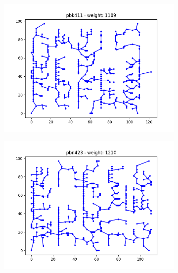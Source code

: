 \documentclass{article}
\def\v{0.4}
\begin{document}
\begin{figure}[h!]
	\centering
	\begin{subfigure}[b]{\v\linewidth}
		\includegraphics[width=\linewidth]{graphs/MST_pbk411.png}
	\end{subfigure}
	\begin{subfigure}[b]{\v\linewidth}
		\includegraphics[width=\linewidth]{graphs/MST_pbn423.png}
	\end{subfigure}
	\begin{subfigure}[b]{\v\linewidth}

\end{subfigure}
\end{figure}
\end{document}
